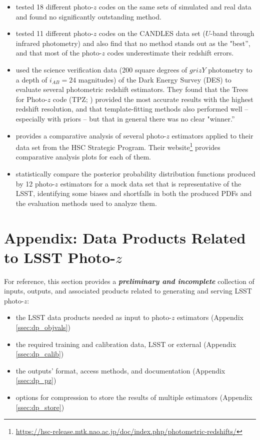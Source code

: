 \documentclass[DM,lsstdraft,toc]{lsstdoc}
\begin{document}
\begin{itemize}
\item \citet{2010A&A...523A..31H} tested 18 different photo-$z$ codes on the same sets of simulated and real data and found no significantly outstanding method.
\item \citet{2013ApJ...775...93D} tested 11 different photo-$z$ codes on the CANDLES data set ($U$-band through infrared photometry) and also find that no method stands out as the "best'', and that most of the photo-$z$ codes underestimate their redshift errors.
\item \citet{2014MNRAS.445.1482S} used the science verification data (200 square degrees of $grizY$ photometry to a depth of $i_{AB}=24$ magnitudes) of the Dark Energy Survey (DES) to evaluate several photometric redshift estimators. They found that the Trees for Photo-$z$ code (TPZ; \citet{2013ascl.soft04011C}) provided the most accurate results with the highest redshift resolution, and that template-fitting methods also performed well -- especially with priors -- but that in general there was no clear "winner.''
\item \citet{2018PASJ...70S...9T} provides a comparative analysis of several photo-$z$ estimators applied to their data set from the HSC Strategic Program. Their website\footnote{\url{https://hsc-release.mtk.nao.ac.jp/doc/index.php/photometric-redshifts/}} provides comparative analysis plots for each of them.
\item \citet{2020arXiv200103621S} statistically compare the posterior probability distribution functions produced by 12 photo-$z$ estimators for a mock data set that is representative of the LSST, identifying some biases and shortfalls in both the produced PDFs and the evaluation methods used to analyze them.
\end{itemize}



\clearpage
\section{Appendix: Data Products Related to LSST Photo-$z$}\label{sec:dp}

For reference, this section provides a \textbf{\textit{preliminary and incomplete}} collection of inputs, outputs, and associated products related to generating and serving LSST photo-$z$:
\begin{itemize}
\item the LSST data products needed as input to photo-$z$ estimators (Appendix \ref{ssec:dp_objvals})
\item the required training and calibration data, LSST or external (Appendix \ref{ssec:dp_calib})
\item the outputs' format, access methods, and documentation (Appendix \ref{ssec:dp_pz})
\item options for compression to store the results of multiple estimators (Appendix \ref{ssec:dp_store})
\end{itemize}
\end{document}
